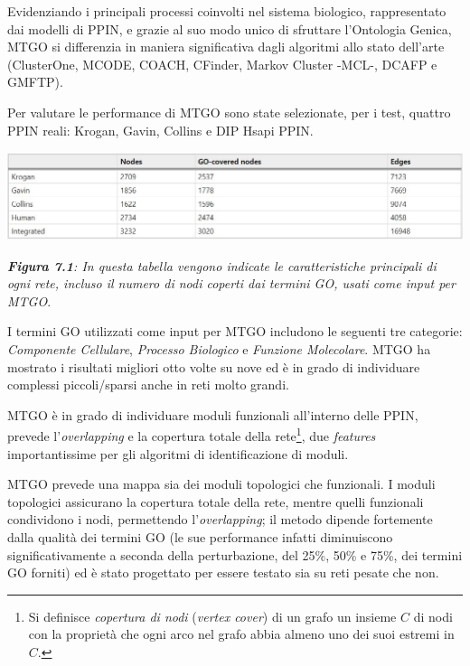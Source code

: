 \documentclass[11pt]{article}
\begin{document}
Evidenziando i principali processi coinvolti nel sistema biologico, rappresentato dai modelli di PPIN, e grazie al suo modo unico di sfruttare l'Ontologia Genica, MTGO si differenzia in maniera significativa dagli algoritmi allo stato dell'arte (ClusterOne, MCODE, COACH, CFinder, Markov Cluster -MCL-, DCAFP e GMFTP). 

Per valutare le performance di MTGO sono state selezionate, per i test, quattro PPIN reali: Krogan, Gavin, Collins e DIP Hsapi PPIN.

\begin{center}
\includegraphics[scale=0.53]{tab1}

\begin{small}\textit{\textbf{Figura 7.1}: In questa tabella vengono indicate le caratteristiche principali di ogni rete, incluso il numero di nodi coperti dai termini GO, usati come input per MTGO}.\end{small}
\end{center}

I termini GO utilizzati come input per MTGO includono le seguenti tre categorie: \textit{Componente Cellulare}, \textit{Processo Biologico} e \textit{Funzione Molecolare}. 
MTGO ha mostrato i risultati migliori otto volte su nove ed è in grado di individuare complessi piccoli/sparsi anche in reti molto grandi.

MTGO è in grado di individuare moduli funzionali all'interno delle PPIN, prevede l'\textit{overlapping} e la copertura totale della rete\footnote{Si definisce \textit{copertura di nodi} (\textit{vertex cover}) di un grafo un insieme $C$ di nodi con la proprietà che ogni arco nel grafo abbia almeno uno dei suoi estremi in $C$.}, due \textit{features} importantissime per gli algoritmi di identificazione di moduli.

MTGO prevede una mappa sia dei moduli topologici che funzionali. I moduli topologici assicurano la copertura totale della rete, mentre quelli funzionali condividono i nodi, permettendo l'\textit{overlapping}; il metodo dipende fortemente dalla qualità dei termini GO (le sue performance infatti diminuiscono significativamente a seconda della perturbazione, del 25\%, 50\% e 75\%, dei termini GO forniti) ed è stato progettato per essere testato sia su reti pesate che non. 
\end{document}
